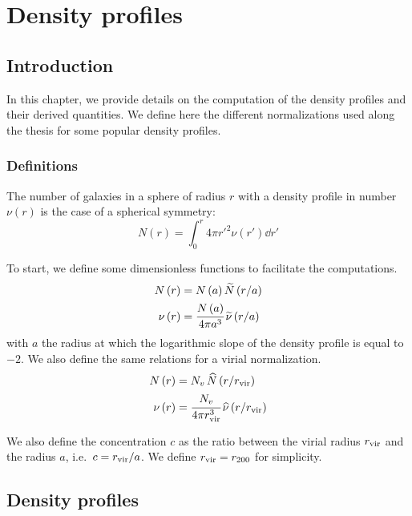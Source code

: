 \chapter{Density profiles}
\label{cha:profiles}

\section{Introduction}

In this chapter, we provide details on the computation of the density profiles
and their derived quantities. We define here the different normalizations used
along the thesis for some popular density profiles.

\subsection{Definitions}

The number of galaxies in a sphere of radius $r$ with a density profile in
number $\nu(r)$ is the case of a spherical symmetry:
%
\begin{equation}
    N\left(r\right)=\int_0^r4\pi {r'}^2 \nu(r')\dd{r'}
\end{equation}

To start, we define some dimensionless functions to facilitate the
computations.
%
\begin{eqnarray}
    N\left(r\right)&=N\left(a\right){\widetilde{N}\left(r/a\right)}\nonumber\\
    \nu\left(r\right)&=
        \cfrac{N\left(a\right)}{4\pi{a^3}}
        \,\widetilde\nu\left(r/a\right)
\end{eqnarray}
%
with $a$ the radius at which the logarithmic slope of the density profile is
equal to $-2$. We also define the same relations for a
virial normalization.
%
\begin{eqnarray}
    N\left(r\right)&={N_v}\,{\widehat{N}\left(r/r_{\rm vir}\right)}\nonumber\\
    \nu\left(r\right)&=
        \cfrac{N_v}{4\pi r_{\rm vir}^3}\,\widehat\nu\left(r/r_{\rm vir}\right)
\end{eqnarray}

We also define the concentration $c$ as the ratio between the virial radius
$r_{\rm vir}$ and the radius $a$, i.e.\ $c=r_{\rm vir}/a$. We define $r_{\rm vir}=r_{200}$ for
simplicity.

\section{Density profiles}
\label{sec:density_profiles}


